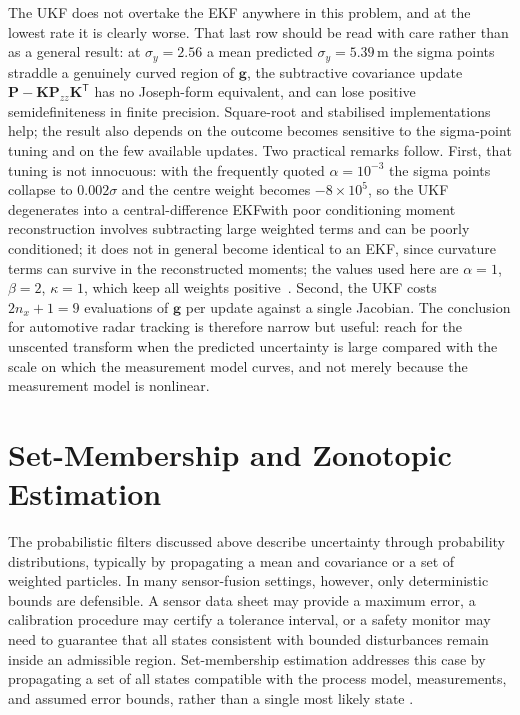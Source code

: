\documentclass[graybox,envcountchap]{style/SNmono}
\providecommand{\DIFadd}[1]{{\protect\color{blue} #1}} %
\providecommand{\DIFdel}[1]{{\protect\color{red} #1}} %
\providecommand{\DIFaddbegin}{} %
\providecommand{\DIFaddend}{} %
\providecommand{\DIFdelbegin}{} %
\providecommand{\DIFdelend}{} %
\begin{document}
\begin{example}
The UKF does not overtake the EKF anywhere in this problem, and at the lowest
rate it is clearly worse. That last row should be read with care rather than
as a general result: at \DIFdelbegin \DIFdel{$\sigma_y=2.56$}\DIFdelend \DIFaddbegin \DIFadd{a mean predicted $\sigma_y=5.39$}\DIFaddend \,m the sigma points straddle a genuinely
curved region of $\mathbf{g}$, the \DIFaddbegin \DIFadd{subtractive }\DIFaddend covariance update $\mathbf{P}-\mathbf{K}\mathbf{P}_{zz}\mathbf{K}^{\mathsf T}$ \DIFdelbegin \DIFdel{has no Joseph-form
equivalent, and }\DIFdelend \DIFaddbegin \DIFadd{can lose positive semidefiniteness in finite precision. Square-root and stabilised implementations help; the result also depends on }\DIFaddend the \DIFdelbegin \DIFdel{outcome becomes sensitive to the }\DIFdelend sigma-point tuning \DIFaddbegin \DIFadd{and on the few available updates}\DIFaddend . Two
practical remarks follow. First, that tuning is not innocuous: with the
frequently quoted $\alpha=10^{-3}$ the sigma points collapse to $0.002\sigma$
and the centre weight becomes $-8\times10^{5}$, so \DIFdelbegin \DIFdel{the UKF degenerates into a
central-difference EKFwith poor conditioning}\DIFdelend \DIFaddbegin \DIFadd{moment reconstruction involves subtracting large weighted terms and can be poorly conditioned; it does not in general become identical to an EKF, since curvature terms can survive in the reconstructed moments}\DIFaddend ; the values used here are
$\alpha=1$, $\beta=2$, $\kappa=1$, which keep all weights
positive~\cite{julier2004_ukf}. Second, the UKF costs $2n_x+1=9$ evaluations of
$\mathbf{g}$ per update against a single Jacobian. The conclusion for
automotive radar tracking is therefore narrow but useful: reach for the
unscented transform when the predicted uncertainty is large compared with the
scale on which the measurement model curves, and not merely because the
measurement model is nonlinear.
\end{example}







\section{Set-Membership and Zonotopic Estimation}
\label{sec:set-membership}

The probabilistic filters discussed above describe uncertainty through probability distributions, typically by propagating a mean and covariance or a set of weighted particles. In many sensor-fusion settings, however, only deterministic bounds are defensible. A sensor data sheet may provide a maximum error, a calibration procedure may certify a tolerance interval, or a safety monitor may need to guarantee that all states consistent with bounded disturbances remain inside an admissible region. Set-membership estimation addresses this case by propagating a set of all states compatible with the process model, measurements, and assumed error bounds, rather than a single most likely state \cite{alamo2005_zonotopes,rego2020_constrained_zonotopes}.
\end{document}
